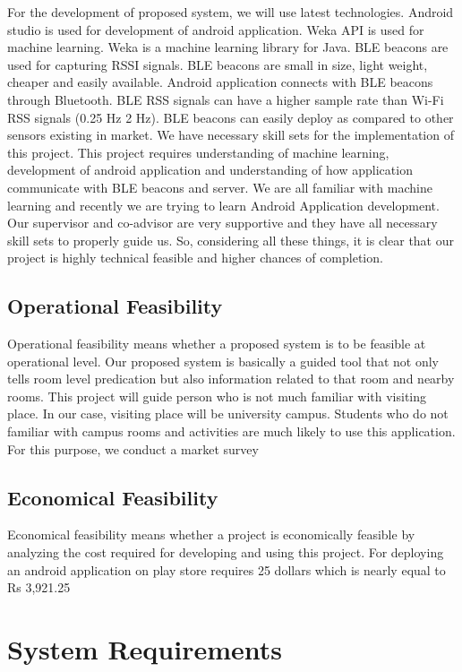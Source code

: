 \documentclass[a4paper, 12pt, oneside]{uet_thesis}
\begin{document}
For the development of proposed system, we will use latest technologies. Android studio is used for development of android application. Weka API is used for machine learning. Weka is a machine learning library for Java. BLE beacons are used for capturing RSSI signals. BLE beacons are small in size, light weight, cheaper and easily available. Android application connects with BLE beacons through Bluetooth. BLE RSS signals can have a higher sample rate than Wi-Fi RSS signals (0.25 Hz 2 Hz). BLE beacons can easily deploy as compared to other sensors existing in market. We have necessary skill sets for the implementation of this project. This project requires understanding of machine learning, development of android application and understanding of how application communicate with BLE beacons and server. We are all familiar with machine learning and recently we are trying to learn Android Application development. Our supervisor and co-advisor are very supportive and they have all necessary skill sets to properly guide us. So, considering all these things, it is clear that our project is highly technical feasible and higher chances of completion.

\section{Operational Feasibility}
Operational feasibility means whether a proposed system is to be feasible at operational level. Our proposed system is basically a guided tool that not only tells room level predication but also information related to that room and nearby rooms. This project will guide person who is not much familiar with visiting place. In our case, visiting place will be university campus. Students who do not familiar with campus rooms and activities are much likely to use this application. For this purpose, we conduct a market survey

\section{Economical Feasibility}
Economical feasibility means whether a project is economically feasible by analyzing the cost required for developing and using this project. For deploying an android application on play store requires 25 dollars which is nearly equal to Rs 3,921.25 

\newpage
\chapter{System Requirements}
\end{document}
